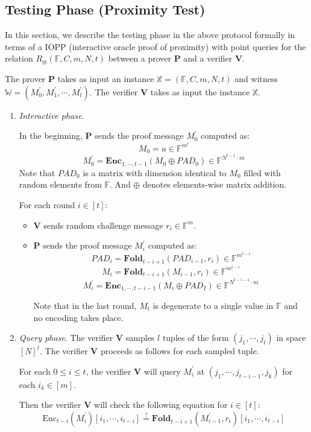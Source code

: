 \subsection{Testing Phase (Proximity Test)}

In this section, we describe the testing phase in the above protocol formally in terms of a IOPP (interactive oracle proof of proximity) with point queries for the relation $R_\otimes(\mathbb{F}, C, m, N, t)$ between a prover $\textbf{P}$ and a verifier $\textbf{V}$.

The prover $\textbf{P}$ takes as input an instance $\mathbb{X} = (\mathbb{F}, C, m, N, t)$ and witness $\mathbb{W} = (M_0^{\prime}, M_1^{\prime}, \cdots, M_{t}^{\prime})$. The verifier $\textbf{V}$ takes as input the instance $\mathbb{X}$.

\begin{enumerate}
    \item \textit{Interactive phase}. 
    
    In the beginning, $\textbf{P}$ sends the proof message $M_0^{\prime}$ computed as:
$$
    M_0 = u \in \mathbb{F}^{m^t}
$$
$$
    M_0^{\prime} = \textbf{Enc}_{1,\cdots,t-1}(M_0 \oplus PAD_0) \in \mathbb{F}^{N^{t-1} \cdot m}
$$
    Note that $PAD_0$ is a matrix with dimension identical to $M_0$ filled with random elements from $\mathbb{F}$. And $\oplus$ denotes elements-wise matrix addition.
    
    For each round $i \in [t]$:
    \begin{itemize}
        \item $\textbf{V}$ sends random challenge message $r_i \in \mathbb{F}^m$.
        \item $\textbf{P}$ sends the proof message $M_i^{\prime}$ computed as:
$$
    PAD_i = \textbf{Fold}_{t-i+1}(PAD_{i-1}, r_i) \in \mathbb{F}^{m^{t-i}}
$$
$$
    M_i = \textbf{Fold}_{t-i+1}(M_{i-1}, r_i) \in \mathbb{F}^{m^{t-i}}
$$
$$
    M_i^\prime =  \textbf{Enc}_{1, \cdots, t- i - 1}(M_i \oplus PAD_I) \in \mathbb{F}^{N^{t-i-1} \cdot m}
$$

    Note that in the last round, $M_t$ is degenerate to a single value in $\mathbb{F}$ and no encoding takes place.

    \end{itemize}
    \item \textit{Query phase}. The verifier $\textbf{V}$ samples $l$ tuples of the form $(j_1, \cdots, j_t)$ in space $[N]^t$.
    The verifier $\textbf{V}$ proceeds as follows for each sampled tuple.
    
    For each $0 \le i \le t$, 
    the verifier $\textbf{V}$ will query $M_{i}^{\prime}$ at $(j_1, \cdots, j_{t-i-1}, j_k)$ for each $i_k \in [m]$. 
    
    Then the verifier $\textbf{V}$ will check the following equation for $i \in [t]$:
\begin{equation}
\label{eq:szkpctc_eq}
    \text{Enc}_{t-i}(M_i^\prime)[i_1, \cdots, i_{t-i}] \stackrel{?}{=} \textbf{Fold}_{t-i+1}(M_{i-1}^\prime, r_i) [i_1, \cdots, i_{t-i}]
\end{equation}

\end{enumerate}

